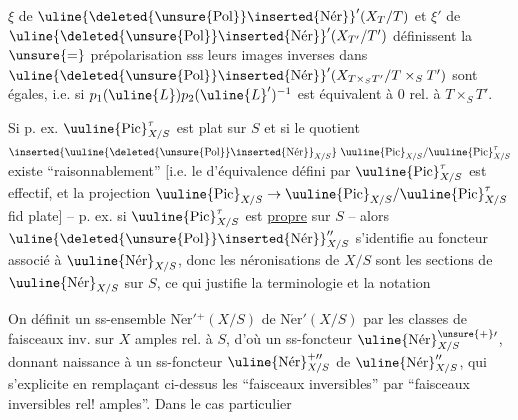 $\xi$ de $\uline{\deleted{\unsure{\operatorname{Pol}}}\inserted{\operatorname{N\acute{e}r}}}'(X_T/T)$ et $\xi'$ de $\uline{\deleted{\unsure{\operatorname{Pol}}}\inserted{\operatorname{N\acute{e}r}}}'(X_{T'}/T')$ définissent la $\unsure{=}$ prépolarisation sss leurs images inverses dans $\uline{\deleted{\unsure{\operatorname{Pol}}}\inserted{\operatorname{N\acute{e}r}}}'(X_{T\times_S T'}/T\times_S T')$ sont égales, i.e. si  $p_1(\uline{L})p_2(\uline{L}')^{-1}$ est  équivalent à $0$ rel. à $T\times_S T'$.

Si p. ex. $\uuline{\operatorname{Pic}}^{\tau}_{X/S}$ est plat sur $S$ et si le quotient $\inserted{\uuline{\deleted{\unsure{\operatorname{Pol}}}\inserted{\operatorname{N\acute{e}r}}}_{X/S}}\ \uuline{\operatorname{Pic}}_{X/S}/\uuline{\operatorname{Pic}}^{\tau}_{X/S}$ existe ``raisonnablement'' [i.e. le   d'équivalence défini par $\uuline{\operatorname{Pic}}^{\tau}_{X/S}$ est effectif, et la projection $\uuline{\operatorname{Pic}}_{X/S}\to\uuline{\operatorname{Pic}}_{X/S}/\uuline{\operatorname{Pic}}^{\tau}_{X/S}$ fid plate] -- p. ex. si $\uuline{\operatorname{Pic}}^{\tau}_{X/S}$ est \uline{propre} sur $S$ -- alors  $\uline{\deleted{\unsure{\operatorname{Pol}}}\inserted{\operatorname{N\acute{e}r}}}''_{X/S}$ s'identifie au foncteur associé à  $\uuline{\operatorname{N\acute{e}r}}_{X/S}$, donc les néronisations de $X/S$ sont les sections de $\uuline{\operatorname{N\acute{e}r}}_{X/S}$ sur $S$, ce qui justifie la terminologie et  la notation


On définit un ss-ensemble $\operatorname{N\acute{e}r}'{}^+(X/S)$ de $\operatorname{N\acute{e}r}'(X/S)$ par les classes de faisceaux inv. sur $X$  amples rel. à $S$, d'où un ss-foncteur $\uline{\operatorname{N\acute{e}r}}^{\unsure{+}\prime}_{X/S}$, donnant naissance à un ss-foncteur $\uline{\operatorname{N\acute{e}r}}^{+\prime\prime}_{X/S}$ de $\uline{\operatorname{N\acute{e}r}}''_{X/S}$, qui s'explicite en remplaçant ci-dessus les ``faisceaux inversibles'' par ``faisceaux inversibles rel! amples''. Dans le cas particulier
